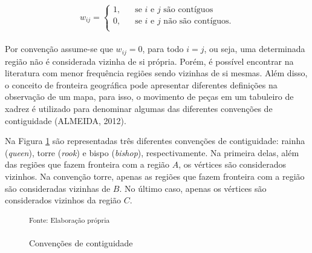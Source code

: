 \documentclass[12pt, a4paper,brazil,oneside]{article}
\begin{document}
	\[
	w_{ij} = 
	\begin{cases}
	\text{1,} & \quad\text{se $i$ e $j$ são contíguos} \\
	\text{0,} & \quad\text{se $i$ e $j$ não são contíguos.}\\
	\end{cases}
	\]
	\\
	
	Por convenção assume-se que  $w_{ij} =  0$, para todo $i = j$, ou seja, uma determinada região não é considerada vizinha de si própria. Porém, é possível encontrar na literatura com menor frequência regiões sendo vizinhas de si mesmas. Além disso, o conceito de fronteira geográfica pode apresentar diferentes definições na observação de um mapa, para isso, o movimento de peças em um tabuleiro de xadrez é utilizado para denominar algumas das diferentes convenções de contiguidade (ALMEIDA, 2012).
	
	Na Figura \ref{contiguidade} são representadas três diferentes convenções de contiguidade: rainha (\textit{queen}), torre (\textit{rook}) e bispo (\textit{bishop}), respectivamente. Na primeira delas, além das regiões que fazem fronteira com a região $A$, os vértices são considerados vizinhos. Na convenção torre, apenas as regiões que fazem fronteira com a região são consideradas vizinhas de $B$. No último caso, apenas os vértices são considerados vizinhos da região $C$.
	
	\begin{figure}[h!]
		\centering
		\small
		\hspace{0.2cm}
		\hspace{0.2cm}
		\caption{Convenções de contiguidade}
		\small \textsuperscript {Fonte: Elaboração própria}
		\label{contiguidade}
	\end{figure}
	
\end{document}
